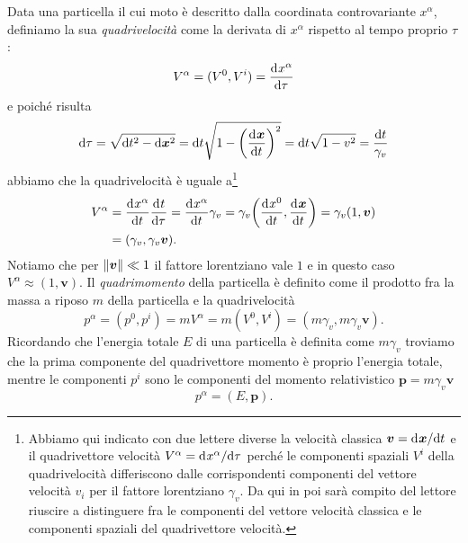 Data una particella il cui moto è descritto dalla coordinata controvariante
$x^{\alpha}$, definiamo la sua \emph{quadrivelocità} come
la derivata di $x^{\alpha}$ rispetto al tempo proprio $\tau$:
\begin{equation}
  V^{\alpha} = (V^{0}, V^{i}) =\frac{{\mathop{}\!\mathrm{d}^{}}x^{\alpha}}{\mathop{}\!\mathrm{d} {\tau}^{}}
\end{equation}
e poiché risulta
\begin{equation}
  \dd \tau = \sqrt{\dd t^{2} - \dd \bm{x}^{2}} = \dd t \sqrt{1 -
    \bigg(\toder{\bm{x}}{t}\bigg)^{2}} = \dd t\sqrt{1 - v^{2}} = \frac{\dd
    t}{\gamma_{v}}
\end{equation}
abbiamo che la quadrivelocità è uguale
a\footnote{Abbiamo qui indicato con due lettere diverse la velocità classica
  $\bm{v} = \mathrm{d}^{}\bm{x} / \mathrm{d} {t}^{}$ e il quadrivettore velocità
  $V^{\alpha} = \mathrm{d}^{}x^{\alpha} / \mathrm{d} {\tau}^{}$ perché le componenti spaziali $V^{i}$
  della quadrivelocità differiscono dalle corrispondenti componenti del vettore
  velocità $v_{i}$ per il fattore lorentziano $\gamma_{v}$.  Da qui in poi sarà
  compito del lettore riuscire a distinguere fra le componenti del vettore
  velocità classica e le componenti spaziali del quadrivettore velocità.}
\begin{equation}
  \begin{split}
    V^{\alpha} &= \toder{x^{\alpha}}{t}\toder{t}{\tau} = \toder{x^{\alpha}}{t}
    \gamma_{v} = \gamma_{v} \bigg(\toder{x^{0}}{t}, \toder{\bm{x}}{t}\bigg) =
    \gamma_{v}(1,\bm{v}) \\
    &= (\gamma_{v}, \gamma_{v}\bm{v}).
  \end{split}
\end{equation}
Notiamo che per $\lVert\bm{v}\rVert \ll 1$ il fattore lorentziano vale $1$ e in
questo caso $V^{\alpha} \approx (1, \bm{v})$.  Il
\emph{quadrimomento} della particella è definito come il
prodotto fra la massa a riposo $m$ della particella e la quadrivelocità
\begin{equation}
  p^{\alpha} = (p^{0},p^{i}) = m V^{\alpha} = m (V^{0}, V^{i}) = (m\gamma_{v},
  m\gamma_{v}\bm{v}).
\end{equation}
Ricordando che l'energia totale $E$ di una particella è definita come
$m\gamma_{v}$ troviamo che la prima componente del quadrivettore momento è
proprio l'energia totale, mentre le componenti $p^{i}$ sono le componenti del
momento relativistico $\bm{p} = m\gamma_{v}\bm{v}$
\begin{equation}
  p^{\alpha} = (E, \bm{p}).
\end{equation}
